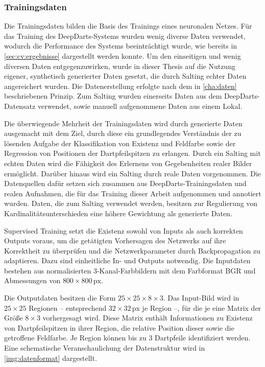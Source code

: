 \subsubsection{Trainingsdaten}
\label{sec:trainingsdaten}

Die Trainingsdaten bilden die Basis des Trainings eines neuronalen Netzes. Für das Training des DeepDarts-Systems wurden wenig diverse Daten verwendet, wodurch die Performance des Systems beeinträchtigt wurde, wie bereits in \autoref{sec:cv:ergebnisse} dargestellt werden konnte. Um den einseitigen und wenig diversen Daten entgegenzuwirken, wurde in dieser Thesis auf die Nutzung eigener, synthetisch generierter Daten gesetzt, die durch Salting echter Daten angereichert wurden. Die Datenerstellung erfolgte nach dem in \autoref{cha:daten} beschriebenen Prinzip. Zum Salting wurden einerseits Daten aus dem DeepDarts-Datensatz verwendet, sowie manuell aufgenommene Daten aus einem Lokal.

Die überwiegende Mehrheit der Trainingsdaten wird durch generierte Daten ausgemacht mit dem Ziel, durch diese ein grundlegendes Verständnis der zu lösenden Aufgabe der Klassifikation von Existenz und Feldfarbe sowie der Regression von Positionen der Dartpfeilspitzen zu erlangen. Durch ein Salting mit echten Daten wird die Fähigkeit des Erlernens von Gegebenheiten realer Bilder ermöglicht. Darüber hinaus wird ein Salting durch reale Daten vorgenommen. Die Datenquellen dafür setzen sich zusammen aus DeepDarts-Trainingsdaten und realen Aufnahmen, die für das Training dieser Arbeit aufgenommen und annotiert wurden. Daten, die zum Salting verwendet werden, besitzen zur Regulierung von Kardinalitätsunterschieden eine höhere Gewichtung als generierte Daten.

Supervised Training setzt die Existenz sowohl von Inputs als auch korrekten Outputs voraus, um die getätigten Vorhersagen des Netzwerks auf ihre Korrektheit zu überprüfen und die Netzwerkparameter durch Backpropagation zu adaptieren. Dazu sind einheitliche In- und Outputs notwendig. Die Inputdaten bestehen aus normalisierten 3-Kanal-Farbbildern mit dem Farbformat BGR und Abmessungen von $800 \times 800\,\text{px}$.

Die Outputdaten besitzen die Form $25 \times 25 \times 8 \times 3$. Das Input-Bild wird in $25 \times 25$ Regionen -- entsprechend $32 \times 32\,\text{px}$ je Region --, für die je eine Matrix der Größe $8 \times 3$ vorhergesagt wird. Diese Matrix enthält Informationen zu Existenz von Dartpfeilspitzen in ihrer Region, die relative Position dieser sowie die getroffene Feldfarbe. Je Region können bis zu 3 Dartpfeile identifiziert werden. Eine schematische Veranschaulichung der Datenstruktur wird in \autoref{img:datenformat} dargestellt.

